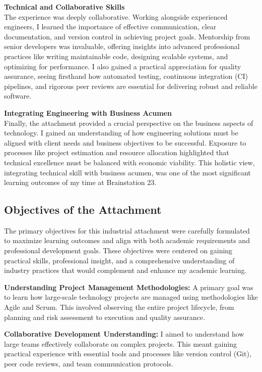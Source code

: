\documentclass[12pt,a4paper]{article}
\begin{document}
\textbf{Technical and Collaborative Skills}\\
The experience was deeply collaborative. Working alongside experienced engineers, I learned the importance of effective communication, clear documentation, and version control in achieving project goals. Mentorship from senior developers was invaluable, offering insights into advanced professional practices like writing maintainable code, designing scalable systems, and optimizing for performance. I also gained a practical appreciation for quality assurance, seeing firsthand how automated testing, continuous integration (CI) pipelines, and rigorous peer reviews are essential for delivering robust and reliable software.

\textbf{Integrating Engineering with Business Acumen}\\
Finally, the attachment provided a crucial perspective on the business aspects of technology. I gained an understanding of how engineering solutions must be aligned with client needs and business objectives to be successful. Exposure to processes like project estimation and resource allocation highlighted that technical excellence must be balanced with economic viability. This holistic view, integrating technical skill with business acumen, was one of the most significant learning outcomes of my time at Brainstation 23.

\subsection{Objectives of the Attachment}
The primary objectives for this industrial attachment were carefully formulated to maximize learning outcomes and align with both academic requirements and professional development goals. These objectives were centered on gaining practical skills, professional insight, and a comprehensive understanding of industry practices that would complement and enhance my academic learning.

\textbf{Understanding Project Management Methodologies:} A primary goal was to learn how large-scale technology projects are managed using methodologies like Agile and Scrum. This involved observing the entire project lifecycle, from planning and risk assessment to execution and quality assurance.

\textbf{Collaborative Development Understanding:} I aimed to understand how large teams effectively collaborate on complex projects. This meant gaining practical experience with essential tools and processes like version control (Git), peer code reviews, and team communication protocols.
\end{document}
